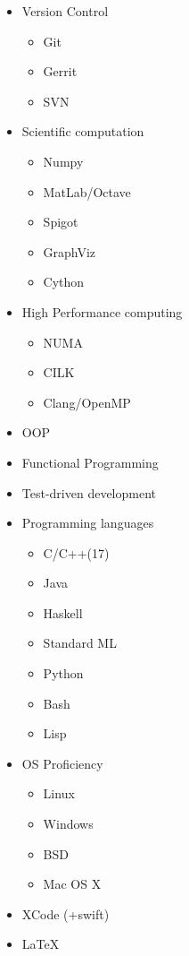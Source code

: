 \documentclass{CurriculumVitae}
\begin{document}
\begin{multicols}{4}
  
  \begin{itemize}[topsep=0pt]
    \setlength{\itemsep}{-0.3em}
  \item Version Control
    \begin{itemize}[topsep=0pt, partopsep=0pt]
      \setlength{\itemsep}{-0.3em}
    \item Git
    \item Gerrit
    \item SVN
    \end{itemize}
  \item Scientific computation
    \begin{itemize}[topsep=0pt, partopsep=0pt]
      \setlength{\itemsep}{-0.3em}
    \item Numpy
    \item MatLab/Octave
    \item Spigot
    \item GraphViz
    \item Cython
    \end{itemize}
  \item High Performance computing
    \begin{itemize}[topsep=0pt, partopsep=0pt]
      \setlength{\itemsep}{-0.3em}
    \item NUMA
    \item CILK
    \item Clang/OpenMP
    \end{itemize}
  \item OOP
  \item Functional Programming
  \item Test-driven development 
  \item Programming languages
    \begin{itemize}[topsep=0pt, partopsep=0pt]
      \setlength{\itemsep}{-0.3em}
    \item C/C++(17)
    \item Java
    \item Haskell
    \item Standard ML
    \item Python
    \item Bash
    \item Lisp
    \end{itemize}
  \item OS Proficiency
    \begin{itemize}[topsep=0pt, partopsep=0pt]
      \setlength{\itemsep}{-0.3em}
    \item Linux
    \item Windows
    \item BSD
    \item Mac OS X
    \end{itemize}
    \item XCode (+swift)
    \item \LaTeX{}
  \end{itemize}
  
\end{multicols}
\end{document}
